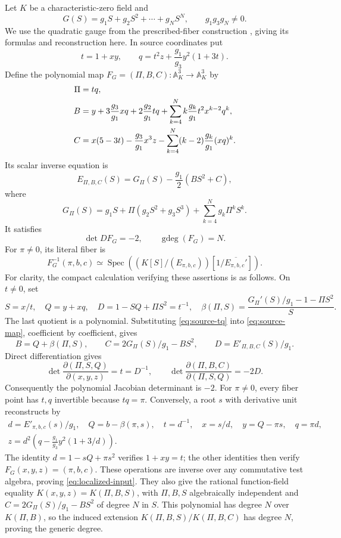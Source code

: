 \documentclass[11pt]{article}
\newcommand{\A}{\mathbb A}
\newcommand{\Spec}{\operatorname{Spec}}
\newcommand{\gdeg}{\operatorname{gdeg}}
\numberwithin{equation}{section}
\begin{document}
Let \(K\) be a characteristic-zero field and
\begin{equation}
 G(S)=g_1S+g_2S^2+\cdots+g_NS^N,\qquad g_1g_3g_N\neq0.
 \label{eq:seed}
\end{equation}
We use the quadratic gauge from the prescribed-fiber construction
\cite{Companion}, giving its formulas and reconstruction here.
In source coordinates put
\begin{equation}
 t=1+xy,\qquad q=t^2z+\frac{g_1}{g_3}y^2(1+3t).
 \label{eq:source-tq}
\end{equation}
Define the polynomial map \(F_G=(\Pi,B,C):\A^3_K\to\A^3_K\) by
\begin{align}
 \Pi={}&tq,\notag\\
 B={}&y+3\frac{g_3}{g_1}xq+2\frac{g_2}{g_1}tq
       +\sum_{k=4}^N k\frac{g_k}{g_1}t^2x^{k-2}q^k,\notag\\
 C={}&x(5-3t)-\frac{g_3}{g_1}x^3z
       -\sum_{k=4}^N(k-2)\frac{g_k}{g_1}(xq)^k.
 \label{eq:source-map}
\end{align}
Its scalar inverse equation is
\[
 E_{\Pi,B,C}(S)=G_\Pi(S)-\frac{g_1}{2}(BS^2+C),
\]
where
\[
 G_\Pi(S)=g_1S+\Pi(g_2S^2+g_3S^3)
          +\sum_{k=4}^Ng_k\Pi^kS^k.
\]
It satisfies
\[
 \det DF_G=-2,\qquad \gdeg(F_G)=N.
\]
For \(\pi\neq0\), its literal fiber is
\begin{equation}
 F_G^{-1}(\pi,b,c)\simeq
 \Spec\left((K[S]/(E_{\pi,b,c}))[1/\overline{E_{\pi,b,c}'}]\right).
 \label{eq:localized-input}
\end{equation}
For clarity, the compact calculation verifying these assertions is as
follows.  On \(t\neq0\), set
\[
 S=x/t,\quad Q=y+xq,\quad D=1-SQ+\Pi S^2=t^{-1},\quad
 \beta(\Pi,S)=\frac{G_\Pi'(S)/g_1-1-\Pi S^2}{S}.
\]
The last quotient is a polynomial.  Substituting \eqref{eq:source-tq} into
\eqref{eq:source-map}, coefficient by coefficient, gives
\[
 B=Q+\beta(\Pi,S),\qquad C=2G_\Pi(S)/g_1-BS^2,\qquad
 D=E'_{\Pi,B,C}(S)/g_1.
\]
Direct differentiation gives
\[
 \det\frac{\partial(\Pi,S,Q)}{\partial(x,y,z)}=t=D^{-1},\qquad
 \det\frac{\partial(\Pi,B,C)}{\partial(\Pi,S,Q)}=-2D.
\]
Consequently the polynomial Jacobian determinant is \(-2\).
For \(\pi\neq0\), every fiber point has \(t,q\) invertible because
\(tq=\pi\).  Conversely, a root \(s\) with derivative unit reconstructs by
\[
 \begin{gathered}
 d=E'_{\pi,b,c}(s)/g_1,\quad Q=b-\beta(\pi,s),\quad
 t=d^{-1},\quad x=s/d,\quad y=Q-\pi s,\quad q=\pi d,\\
 z=d^2\left(q-\frac{g_1}{g_3}y^2(1+3/d)\right).
 \end{gathered}
\]
The identity \(d=1-sQ+\pi s^2\) verifies \(1+xy=t\); the other identities
then verify \(F_G(x,y,z)=(\pi,b,c)\).  These operations are inverse over
any commutative test algebra, proving \eqref{eq:localized-input}.
They also give the rational function-field equality
\(K(x,y,z)=K(\Pi,B,S)\), with \(\Pi,B,S\) algebraically independent and
\(C=2G_\Pi(S)/g_1-BS^2\) of degree \(N\) in \(S\).  This polynomial
has degree \(N\) over \(K(\Pi,B)\), so the induced extension
\(K(\Pi,B,S)/K(\Pi,B,C)\) has degree \(N\), proving the generic degree.
\end{document}
